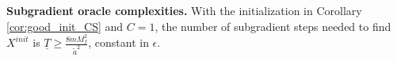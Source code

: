 \documentclass[10pt]{article}
\newcommand{\mb}{\mathbf}
\newcommand{\R}{\mathbb{R}}
\newtheorem{corollary}{Corollary}[section]
\begin{document}







\textbf{Subgradient oracle complexities.} With the initialization in Corollary \ref{cor:good_init_CS} and $C = 1$, the number of subgradient steps needed to find $X^{init}$ is $\underline{T}\geq \frac{8mM_f^2}{\widetilde{a}^2}$, constant in $\epsilon$.
\end{document}
